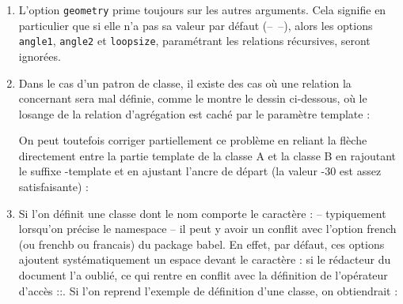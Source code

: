 \documentclass[a4paper,11pt]{report}
\newcommand{\inputTikZ}[1]{%
  }%
\newcommand{\inputTikZ}[1]{%
    \texttt{[image: fig/\#1.pdf]}%
  }%
\begin{document}
\begin{enumerate}
\item L'option {\tt geometry} prime toujours sur les autres arguments. Cela signifie en particulier que si elle n'a pas sa valeur par défaut (--~--), alors les options {\tt angle1}, {\tt angle2} et {\tt loopsize}, paramétrant les relations récursives, seront ignorées.
\item Dans le cas d'un patron de classe, il existe des cas où une relation la concernant sera mal définie, comme le montre le dessin ci-dessous, où le losange de la relation d'agrégation est caché par le paramètre template :

\begin{minipage}{0.6\textwidth}

\end{minipage}
\begin{minipage}{0.4\textwidth}
\begin{center}
\inputTikZ{bugtemplate}
\end{center}
\end{minipage}

\medskip

On peut toutefois corriger partiellement ce problème en reliant la flèche directement entre la partie template de la classe A et la classe B en rajoutant le suffixe -template et en ajustant l'ancre de départ (la valeur -30 est assez satisfaisante) : 

\medskip

\begin{minipage}{0.6\textwidth}

\end{minipage}
\begin{minipage}{0.4\textwidth}
\begin{center}
\inputTikZ{bugtemplate2}
\end{center}
\end{minipage}

\medskip

\item Si l'on définit une classe dont le nom comporte le caractère : -- typiquement lorsqu'on précise le namespace -- il peut y avoir un conflit avec l'option french (ou frenchb ou francais) du package babel. En effet, par défaut, ces options ajoutent systématiquement un espace devant le caractère : si le rédacteur du document l'a oublié, ce qui rentre en conflit avec la définition de l'opérateur d'accès ::. Si l'on reprend l'exemple de définition d'une classe, on obtiendrait :


\end{enumerate}
\end{document}
